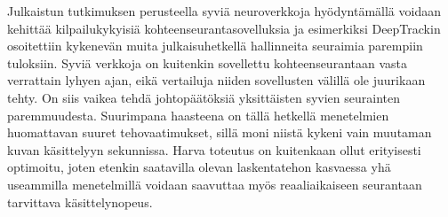 Julkaistun tutkimuksen perusteella syviä neuroverkkoja hyödyntämällä voidaan kehittää
kilpailukykyisiä kohteenseurantasovelluksia ja esimerkiksi DeepTrackin osoitettiin
kykenevän muita julkaisuhetkellä hallinneita seuraimia parempiin tuloksiin. Syviä
verkkoja on kuitenkin sovellettu kohteenseurantaan vasta verrattain lyhyen ajan, eikä
vertailuja niiden sovellusten välillä ole juurikaan tehty. On siis vaikea tehdä johtopäätöksiä
yksittäisten syvien seurainten paremmuudesta. Suurimpana haasteena on tällä hetkellä
menetelmien huomattavan suuret tehovaatimukset, sillä moni niistä kykeni vain muutaman
kuvan käsittelyyn sekunnissa. Harva toteutus on kuitenkaan ollut erityisesti optimoitu,
joten etenkin saatavilla olevan laskentatehon kasvaessa yhä useammilla menetelmillä voidaan
saavuttaa myös reaaliaikaiseen seurantaan tarvittava käsittelynopeus.

\renewcommand{\thesubsection}{\oldsubection}
